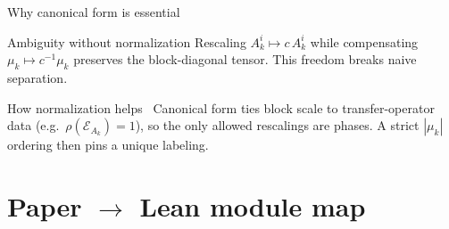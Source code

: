 \documentclass[aspectratio=169,10pt]{beamer}
\newcommand{\cE}{\mathcal{E}}
\begin{document}
\begin{frame}{Why canonical form is essential}
    \vspace{-0.6em}

    \begin{block}{Ambiguity without normalization}
        Rescaling $A_k^i \mapsto c\, A_k^i$ while compensating $\mu_k \mapsto c^{-1}\mu_k$
        preserves the block-diagonal tensor. This freedom breaks naive separation.
    \end{block}

    \begin{block}{How normalization helps~\cite{Cirac2017Annals,Cirac2021Matrix}}
        Canonical form ties block scale to transfer-operator data
        (e.g.\ $\rho(\cE_{A_k})=1$), so the only allowed rescalings are phases.
        A strict $|\mu_k|$ ordering then pins a unique labeling.
    \end{block}
\end{frame}

\section{\texorpdfstring{Paper $\to$ Lean module map}{Paper to Lean module map}}
\end{document}
